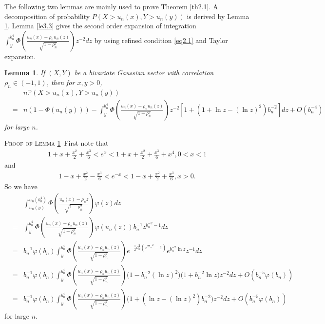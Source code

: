 \documentclass[10pt,twosided]{article}
\newtheorem{lemma}{Lemma}[section]
\numberwithin{equation}{section}
\numberwithin{equation}{section}
\newcommand{\prooflem}[1]{\textsc{Proof of Lemma} \ref{#1}}
\newcommand{\pk}[1]{\mathbb{P} \left( #1 \right) }
\begin{document}
The following two lemmas are mainly used to prove Theorem \ref{th2.1}.
A decomposition of probability $P(X>u_n(x),Y>u_n(y))$
is derived by Lemma \ref{le3.2}.
Lemma \ref{le3.3} gives the second order expansion of integration
$\int_{y}^{b_n^4}\Phi\left( \frac{u_n(x)-\rho_n u_n(z)}{\sqrt{1-\rho_n^2}} \right)z^{-2}dz$ by using refined condition \eqref{eq2.1} and Taylor expansion.
\begin{lemma}\label{le3.2}
If $(X,Y)$ be a bivariate Gaussian vector with correlation $\rho_{n} \in (-1,1)$, then
for $x,y>0$,
\begin{eqnarray}\label{addeq3.3}
&&n\pk{X>u_n(x),Y>u_n(y)} \nonumber \\
&=&n(1-\Phi(u_n(y)))
-\int_y^{b_{n}^{4}}\Phi\left(\frac{u_n(x)-\rho_{n} u_n(z)}{\sqrt{1-\rho_{n}^2}}\right)z^{-2}
\left[1+(1+\ln z-(\ln z)^2)b_n^{-2}\right]dz+O(b_n^{-4})
\end{eqnarray}
for large $n$.
\end{lemma}

\prooflem{le3.2}~First note that
\begin{eqnarray}\label{waddeq1}
1+x+\frac{x^{2}}{2}+\frac{x^{3}}{6}<e^{x}<1+x+\frac{x^{2}}{2}+\frac{x^{3}}{6}+x^4, 0<x<1
\end{eqnarray}
and
\begin{eqnarray}\label{waddeq2}
1-x+\frac{x^2}{2}-\frac{x^3}{6}<e^{-x}<1-x+\frac{x^2}{2}+\frac{x^3}{6}, x>0.
\end{eqnarray}
So we have
\begin{eqnarray}\label{addeq3.4}
& & \int_{u_{n}(y)}^{u_{n}(b_{n}^{4})}\Phi\left( \frac{u_{n}(x)-\rho_{n}z}{\sqrt{1-\rho_{n}^{2}}}\right)\varphi(z)dz \nonumber \\
&=& \int_{y}^{b_{n}^{4}} \Phi\left(\frac{u_n(x)-\rho_{n} u_n(z)}{\sqrt{1-\rho_{n}^2}}\right)
\varphi(u_n(z))b_n^{-1}z^{b_n^{-2}-1}dz \nonumber \\
&=&b_n^{-1}\varphi(b_n)\int_y^{b_{n}^{4}}\Phi\left(\frac{u_n(x)-\rho_{n} u_n(z)}{\sqrt{1-\rho_{n}^2}}\right)
e^{-\frac{1}{2}b_n^2(z^{2b_n^{-2}}-1)}e^{b_n^{-2}\ln z}z^{-1} dz \nonumber\\
&=&b_n^{-1}\varphi(b_n)\int_y^{b_{n}^{4}}\Phi\left(\frac{u_n(x)-\rho_{n} u_n(z)}{\sqrt{1-\rho_{n}^2}}\right)
\Big( 1- b_{n}^{-2}(\ln z)^{2} \Big)
\Big( 1+b_{n}^{-2}\ln z  \Big) z^{-2}dz+O(b_n^{-5}\varphi(b_n)) \nonumber \\
&=& b_n^{-1}\varphi(b_n)\int_y^{b_{n}^{4}}\Phi\left(\frac{u_n(x)-\rho_{n} u_n(z)}{\sqrt{1-\rho_{n}^2}}\right)
\Big( 1+ (\ln z -(\ln z)^{2} )b_{n}^{-2}  \Big) z^{-2} dz +O(b_n^{-5}\varphi(b_n))
\end{eqnarray}
for large $n$.
\end{document}
